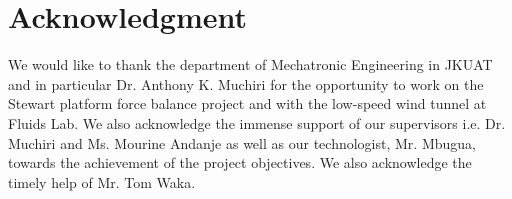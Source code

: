 \section*{Acknowledgment}
We would like to thank the department of Mechatronic Engineering in JKUAT and in
particular Dr. Anthony K. Muchiri for the opportunity to work on the Stewart platform
force balance project and with the low-speed wind tunnel at Fluids Lab. We also acknowledge
the immense support of our supervisors i.e. Dr. Muchiri and Ms. Mourine
Andanje as well as our technologist, Mr. Mbugua, towards the achievement of the project
objectives. We also acknowledge the timely help of Mr. Tom Waka.


